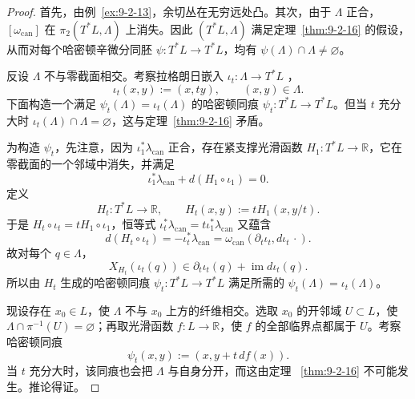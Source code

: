 \begin{proof}
首先，由例~\ref{ex:9-2-13}，余切丛在无穷远处凸。其次，由于 $\Lambda$ 正合，
$[\omega_{\mathrm{can}}]$ 在 $\pi_2(T^*L,\Lambda)$ 上消失。因此
$(T^*L,\Lambda)$ 满足定理~\ref{thm:9-2-16} 的假设，从而对每个哈密顿辛微分同胚
$\psi:T^*L\to T^*L$，均有
$\psi(\Lambda)\cap\Lambda\ne\varnothing$。

反设 $\Lambda$ 不与零截面相交。考察拉格朗日嵌入
$\iota_t:\Lambda\to T^*L$
，
\[
  \iota_t(x,y):=(x,ty),
  \qquad (x,y)\in\Lambda.
\]
下面构造一个满足 $\psi_t(\Lambda)=\iota_t(\Lambda)$ 的哈密顿同痕
$\psi_t:T^*L\to T^*L$。但当 $t$ 充分大时
$\iota_t(\Lambda)\cap\Lambda=\varnothing$，这与定理~\ref{thm:9-2-16} 矛盾。

为构造 $\psi_t$，先注意，因为 $\iota_1^*\lambda_{\mathrm{can}}$ 正合，存在紧支撑光滑函数
$H_1:T^*L\to\mathbb R$，它在零截面的一个邻域中消失，并满足
\[
  \iota_1^*\lambda_{\mathrm{can}}+d(H_1\circ\iota_1)=0.
\]
定义
\[
  H_t:T^*L\longrightarrow\mathbb R,
  \qquad H_t(x,y):=tH_1(x,y/t).
\]
于是 $H_t\circ\iota_t=tH_1\circ\iota_1$，恒等式
$\iota_t^*\lambda_{\mathrm{can}}=t\iota_1^*\lambda_{\mathrm{can}}$ 又蕴含
\[
  d(H_t\circ\iota_t)
  =-\iota_t^*\lambda_{\mathrm{can}}
  =\omega_{\mathrm{can}}(\partial_t\iota_t,d\iota_t\,·).
\]
故对每个 $q\in\Lambda$，
\[
  X_{H_t}(\iota_t(q))\in\partial_t\iota_t(q)+\operatorname{im}d\iota_t(q).
\]
所以由 $H_t$ 生成的哈密顿同痕 $\psi_t:T^*L\to T^*L$ 满足所需的
$\psi_t(\Lambda)=\iota_t(\Lambda)$。

现设存在 $x_0\in L$，使 $\Lambda$ 不与 $x_0$ 上方的纤维相交。选取 $x_0$ 的开邻域
$U\subset L$，使 $\Lambda\cap\pi^{-1}(U)=\varnothing$；再取光滑函数
$f:L\to\mathbb R$，使 $f$ 的全部临界点都属于 $U$。考察哈密顿同痕
\[
  \psi_t(x,y):=(x,y+t\,df(x)).
\]
当 $t$ 充分大时，该同痕也会把 $\Lambda$ 与自身分开，而这由定理
~\ref{thm:9-2-16} 不可能发生。推论得证。
\end{proof}

